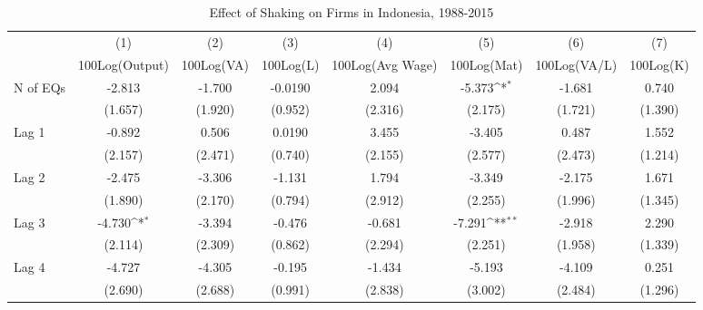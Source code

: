 \begin{table}[htbp]\centering
\def\sym#1{\ifmmode^{#1}\else\(^{#1}\)\fi}
\caption{Effect of Shaking on Firms in Indonesia, 1988-2015}
\begin{tabular}{l*{7}{c}}
\toprule
                &\multicolumn{1}{c}{(1)}&\multicolumn{1}{c}{(2)}&\multicolumn{1}{c}{(3)}&\multicolumn{1}{c}{(4)}&\multicolumn{1}{c}{(5)}&\multicolumn{1}{c}{(6)}&\multicolumn{1}{c}{(7)}\\
                &\multicolumn{1}{c}{100Log(Output)}&\multicolumn{1}{c}{100Log(VA)}&\multicolumn{1}{c}{100Log(L)}&\multicolumn{1}{c}{100Log(Avg Wage)}&\multicolumn{1}{c}{100Log(Mat)}&\multicolumn{1}{c}{100Log(VA/L)}&\multicolumn{1}{c}{100Log(K)}\\
\midrule
N of EQs        &   -2.813         &   -1.700         &  -0.0190         &    2.094         &   -5.373\sym{*}  &   -1.681         &    0.740         \\
                &  (1.657)         &  (1.920)         &  (0.952)         &  (2.316)         &  (2.175)         &  (1.721)         &  (1.390)         \\
\addlinespace
Lag 1           &   -0.892         &    0.506         &   0.0190         &    3.455         &   -3.405         &    0.487         &    1.552         \\
                &  (2.157)         &  (2.471)         &  (0.740)         &  (2.155)         &  (2.577)         &  (2.473)         &  (1.214)         \\
\addlinespace
Lag 2           &   -2.475         &   -3.306         &   -1.131         &    1.794         &   -3.349         &   -2.175         &    1.671         \\
                &  (1.890)         &  (2.170)         &  (0.794)         &  (2.912)         &  (2.255)         &  (1.996)         &  (1.345)         \\
\addlinespace
Lag 3           &   -4.730\sym{*}  &   -3.394         &   -0.476         &   -0.681         &   -7.291\sym{**} &   -2.918         &    2.290         \\
                &  (2.114)         &  (2.309)         &  (0.862)         &  (2.294)         &  (2.251)         &  (1.958)         &  (1.339)         \\
\addlinespace
Lag 4           &   -4.727         &   -4.305         &   -0.195         &   -1.434         &   -5.193         &   -4.109         &    0.251         \\
                &  (2.690)         &  (2.688)         &  (0.991)         &  (2.838)         &  (3.002)         &  (2.484)         &  (1.296)         \\

\end{tabular}
\end{table}
